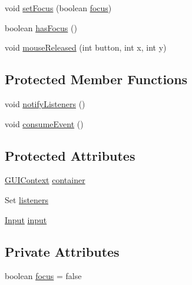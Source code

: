 \begin{DoxyCompactItemize}
\item 
void \mbox{\hyperlink{classorg_1_1newdawn_1_1slick_1_1gui_1_1_abstract_component_a92a19e06c7872abfb02d7e6625f449eb}{set\+Focus}} (boolean \mbox{\hyperlink{classorg_1_1newdawn_1_1slick_1_1gui_1_1_abstract_component_a9a7b67f481728081895d167e792aaa74}{focus}})
\item 
boolean \mbox{\hyperlink{classorg_1_1newdawn_1_1slick_1_1gui_1_1_abstract_component_a9dc45673bb368814f9e48ea846953abd}{has\+Focus}} ()
\item 
void \mbox{\hyperlink{classorg_1_1newdawn_1_1slick_1_1gui_1_1_abstract_component_a70585519bb21610b43de4743366732f5}{mouse\+Released}} (int button, int x, int y)
\end{DoxyCompactItemize}
\subsection*{Protected Member Functions}
\begin{DoxyCompactItemize}
\item 
void \mbox{\hyperlink{classorg_1_1newdawn_1_1slick_1_1gui_1_1_abstract_component_a949d3e24f0b4fa639c92efef6db3dcc7}{notify\+Listeners}} ()
\item 
void \mbox{\hyperlink{classorg_1_1newdawn_1_1slick_1_1gui_1_1_abstract_component_a76fb8b7de47e5ed6129010ad3d6e748d}{consume\+Event}} ()
\end{DoxyCompactItemize}
\subsection*{Protected Attributes}
\begin{DoxyCompactItemize}
\item 
\mbox{\hyperlink{interfaceorg_1_1newdawn_1_1slick_1_1gui_1_1_g_u_i_context}{G\+U\+I\+Context}} \mbox{\hyperlink{classorg_1_1newdawn_1_1slick_1_1gui_1_1_abstract_component_af6d1abaa24da0b9a06fb153722e15435}{container}}
\item 
Set \mbox{\hyperlink{classorg_1_1newdawn_1_1slick_1_1gui_1_1_abstract_component_a7cec595b9b830ed15376739af35a1492}{listeners}}
\item 
\mbox{\hyperlink{classorg_1_1newdawn_1_1slick_1_1_input}{Input}} \mbox{\hyperlink{classorg_1_1newdawn_1_1slick_1_1gui_1_1_abstract_component_a06d7d458d50451485923e23c7d9d2b60}{input}}
\end{DoxyCompactItemize}
\subsection*{Private Attributes}
\begin{DoxyCompactItemize}
\item 
boolean \mbox{\hyperlink{classorg_1_1newdawn_1_1slick_1_1gui_1_1_abstract_component_a9a7b67f481728081895d167e792aaa74}{focus}} = false
\end{DoxyCompactItemize}
